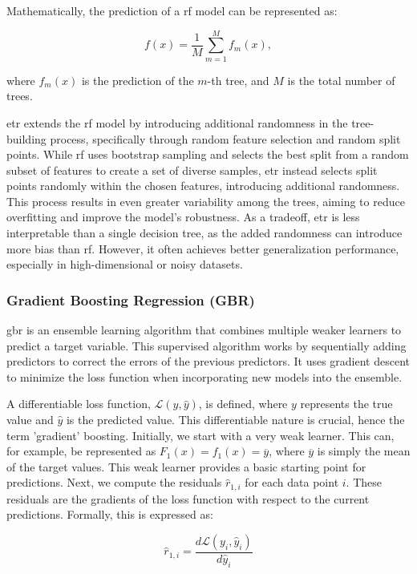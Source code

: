 Mathematically, the prediction of a \gls{rf} model can be represented as:

$$
f(x) = \frac{1}{M} \sum_{m=1}^{M} f_m(x),
$$

where $f_m(x)$ is the prediction of the $m$-th tree, and $M$ is the total number of trees.

\gls{etr} extends the \gls{rf} model by introducing additional randomness in the tree-building process, specifically through random feature selection and random split points.
While \gls{rf} uses bootstrap sampling and selects the best split from a random subset of features to create a set of diverse samples, \gls{etr} instead selects split points randomly within the chosen features, introducing additional randomness.
This process results in even greater variability among the trees, aiming to reduce overfitting and improve the model's robustness.
As a tradeoff, \gls{etr} is less interpretable than a single decision tree, as the added randomness can introduce more bias than \gls{rf}.
However, it often achieves better generalization performance, especially in high-dimensional or noisy datasets.

\subsubsection{Gradient Boosting Regression (GBR)}\label{sec:gradientboost}
\gls{gbr} is an ensemble learning algorithm that combines multiple weaker learners to predict a target variable.
This supervised algorithm works by sequentially adding predictors to correct the errors of the previous predictors.
It uses gradient descent to minimize the loss function when incorporating new models into the ensemble.

A differentiable loss function, $\mathcal{L}(y, \hat{y})$, is defined, where $y$ represents the true value and $\hat{y}$ is the predicted value.
This differentiable nature is crucial, hence the term 'gradient' boosting.
Initially, we start with a very weak learner.
This can, for example, be represented as $F_{1}(x) = f_{1}(x) = \overline{y}$, where $\overline{y}$ is simply the mean of the target values.
This weak learner provides a basic starting point for predictions.
Next, we compute the residuals \(\hat{r}_{1,i}\) for each data point \(i\).
These residuals are the gradients of the loss function with respect to the current predictions.
Formally, this is expressed as:

$$
\hat{r}_{1,i} = \frac{d \mathcal{L}(y_{i}, \hat{y}_{i})}{d \hat{y}_{i}}
$$

